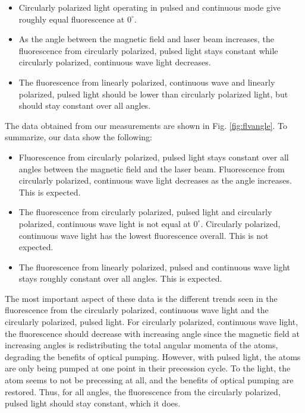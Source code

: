 \begin{itemize}
	\item Circularly polarized light operating in pulsed and continuous mode give roughly equal fluorescence at $0^{\circ}$.
	\item As the angle between the magnetic field and laser beam increases, the fluorescence from circularly polarized, pulsed light stays constant while circularly polarized, continuous wave light decreases.
	\item The fluorescence from linearly polarized, continuous wave and linearly polarized, pulsed light should be lower than circularly polarized light, but should stay constant over all angles.
\end{itemize}

The data obtained from our measurements are shown in Fig. \ref{fig:flvangle}. To summarize, our data show the following:
\begin{itemize}
	\item Fluorescence from circularly polarized, pulsed light stays constant over all angles between the magnetic field and the laser beam. Fluorescence from circularly polarized, continuous wave light decreases as the angle increases. This is expected.
	\item The fluorescence from circularly polarized, pulsed light and circularly polarized, continuous wave light is not equal at $0^{\circ}$. Circularly polarized, continuous wave light has the lowest fluorescence overall. This is not expected.
	\item The fluorescence from linearly polarized, pulsed and continuous wave light stays roughly constant over all angles. This is expected.
\end{itemize}

The most important aspect of these data is the different trends seen in the fluorescence from the circularly polarized, continuous wave light and the circularly polarized, pulsed light. For circularly polarized, continuous wave light, the fluorescence should decrease with increasing angle since the magnetic field at increasing angles is redistributing the total angular momenta of the atoms, degrading the benefits of optical pumping. However, with pulsed light, the atoms are only being pumped at one point in their precession cycle. To the light, the atom seems to not be precessing at all, and the benefits of optical pumping are restored. Thus, for all angles, the fluorescence from the circularly polarized, pulsed light should stay constant, which it does.

